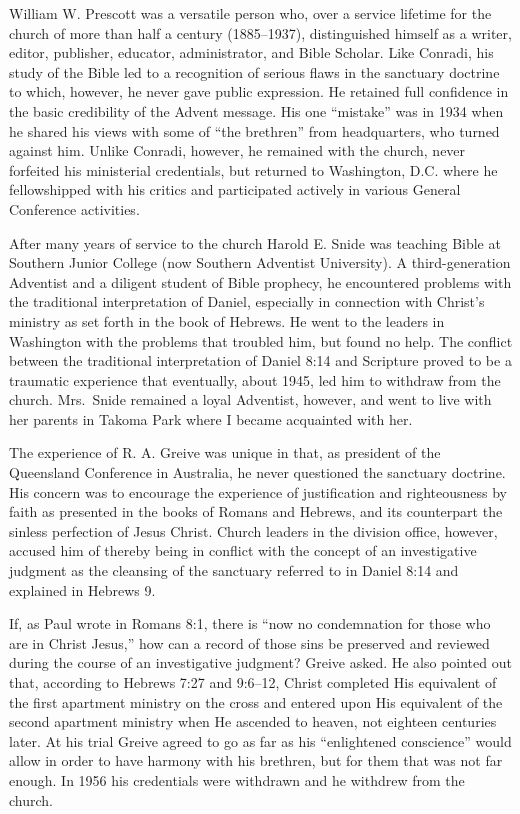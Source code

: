 William W. Prescott was a versatile person who, over a service lifetime for
the church of more than half a century (1885--1937), distinguished himself as
a writer, editor, publisher, educator, administrator, and Bible Scholar.
Like Conradi, his study of the Bible led to a recognition of serious flaws
in the sanctuary doctrine to which, however, he never gave public
expression. He retained full confidence in the basic credibility of the
Advent message. His one ``mistake'' was in 1934 when he shared his views with
some of ``the brethren'' from headquarters, who turned against him. Unlike
Conradi, however, he remained with the church, never forfeited his
ministerial credentials, but returned to Washington, D.C. where he
fellowshipped with his critics and participated actively in various General
Conference activities.

After many years of service to the church Harold E. Snide was teaching Bible
at Southern Junior College (now Southern Adventist University). A
third-generation Adventist and a diligent student of Bible prophecy, he
encountered problems with the traditional interpretation of Daniel,
especially in connection with Christ's ministry as set forth in the book of
Hebrews. He went to the leaders in Washington with the problems that
troubled him, but found no help. The conflict between the traditional
interpretation of Daniel 8:14 and Scripture proved to be a traumatic
experience that eventually, about 1945, led him to withdraw from the church.
Mrs.\ Snide remained a loyal Adventist, however, and went to live with her
parents in Takoma Park where I became acquainted with her. 

The experience of R. A. Greive was unique in that, as president of the
Queensland Conference in Australia, he never questioned the sanctuary
doctrine. His concern was to encourage the experience of justification and
righteousness by faith as presented in the books of Romans and Hebrews, and
its counterpart the sinless perfection of Jesus Christ. Church leaders in
the division office, however, accused him of thereby being in conflict with
the concept of an investigative judgment as the cleansing of the sanctuary
referred to in Daniel 8:14 and explained in Hebrews 9.

If, as Paul wrote in Romans 8:1, there is ``now no condemnation for those who
are in Christ Jesus,'' how can a record of those sins be preserved and
reviewed during the course of an investigative judgment? Greive asked. He
also pointed out that, according to Hebrews 7:27 and 9:6--12, Christ
completed His equivalent of the first apartment ministry on the cross and
entered upon His equivalent of the second apartment ministry when He
ascended to heaven, not eighteen centuries later. At his trial Greive agreed
to go as far as his ``enlightened conscience'' would allow in order to have 
harmony with his brethren, but for them that was not far enough. In 1956 his
credentials were withdrawn and he withdrew from the church.

